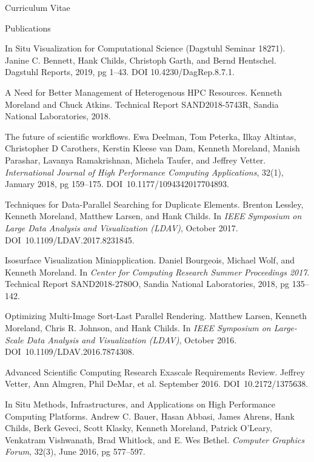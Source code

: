 \documentclass{article}
\begin{document}
\begin{cv}{Curriculum Vitae}
    \begin{cvlist}{Publications}
    \item[In Situ Visualization for Computational Science]
      (Dagstuhl Seminar 18271).
      Janine C. Bennett, Hank Childs, Christoph Garth, and Bernd Hentschel.
      Dagstuhl Reports, 2019, pg 1--43. DOI 10.4230/DagRep.8.7.1.
    \item[A Need for Better Management of Heterogenous HPC Resources.]
      Kenneth Moreland and Chuck Atkins.
      Technical Report SAND2018-5743R, Sandia National Laboratories, 2018.
    \item[The future of scientific workflows.]
      Ewa Deelman, Tom Peterka, Ilkay Altintas, Christopher D Carothers, Kerstin Kleese van Dam, Kenneth Moreland, Manish Parashar, Lavanya Ramakrishnan, Michela Taufer, and Jeffrey Vetter.
      \emph{International Journal of High Performance Computing Applications}, 32(1), January 2018, pg 159--175.
      DOI~10.1177/1094342017704893.
    \item[Techniques for Data-Parallel Searching for Duplicate Elements.]
      Brenton Lessley, Kenneth Moreland, Matthew Larsen, and Hank Childs.
      In \emph{IEEE Symposium on Large Data Analysis and Visualization (LDAV)}, October 2017.
      DOI~10.1109/LDAV.2017.8231845.
    \item[Isosurface Visualization Miniapplication.]
      Daniel Bourgeois, Michael Wolf, and Kenneth Moreland.
      In \emph{Center for Computing Research Summer Proceedings 2017}.
      Technical Report SAND2018-2780O, Sandia National Laboratories, 2018, pg 135--142. 
    \item[Optimizing Multi-Image Sort-Last Parallel Rendering.]
      Matthew Larsen, Kenneth Moreland, Chris R. Johnson, and Hank Childs.
      In \emph{IEEE Symposium on Large-Scale Data Analysis and Visualization (LDAV)}, October 2016.
      DOI~10.1109/LDAV.2016.7874308.
    \item[Advanced Scientific Computing Research Exascale Requirements Review.]
      Jeffrey Vetter, Ann Almgren, Phil DeMar, et al.
      September 2016.
      DOI~10.2172/1375638.
    \item[In Situ Methods, Infrastructures, and Applications on High Performance]~\\ Computing Platforms.
      Andrew C. Bauer, Hasan Abbasi, James Ahrens, Hank Childs, Berk Geveci, Scott Klasky, Kenneth Moreland, Patrick O'Leary, Venkatram Vishwanath, Brad Whitlock, and E. Wes Bethel.
      \emph{Computer Graphics Forum}, 32(3), June 2016, pg 577--597.

\end{cvlist}
\end{cv}
\end{document}

